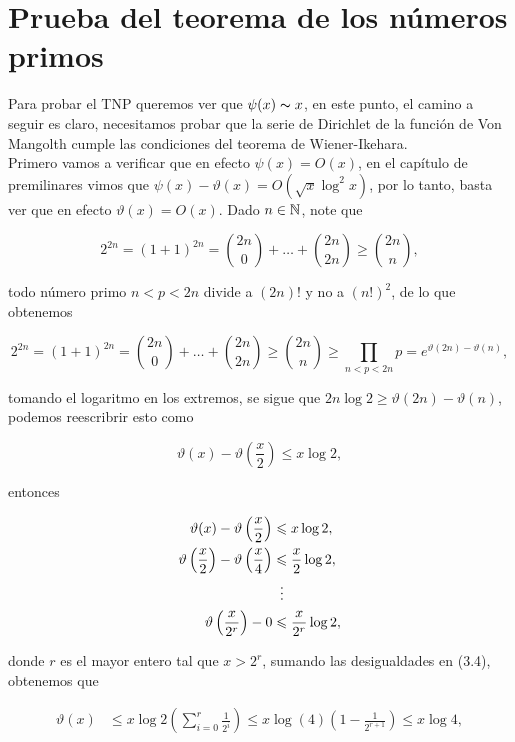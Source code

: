 \section{Prueba del teorema de los números primos}

Para probar el TNP queremos ver que $\psi(x)\thicksim x$, en este punto, el camino a seguir es claro, necesitamos probar que la serie de Dirichlet de la función de Von Mangolth cumple las condiciones del teorema de Wiener-Ikehara.\\

Primero vamos a verificar que en efecto $\psi(x)=O(x)$, en el capítulo de premilinares vimos que $\psi(x)-\vartheta(x)=O(\sqrt{x}\log^2 x)$, por lo tanto, basta ver que en efecto $\vartheta(x)=O(x)$. Dado $n\in \N$, note que

$$2^{2n}=(1+1)^{2n}=\binom{2n}{0}+\ldots+\binom{2n}{2n}\geq \binom{2n}{n},$$

todo número primo $n<p<2n$ divide a $(2n)!$ y no a $(n!)^2$, de lo que obtenemos

$$2^{2n}=(1+1)^{2n}=\binom{2n}{0}+\ldots+\binom{2n}{2n}\geq \binom{2n}{n}\geq \prod_{n<p<2n}p=e^{\displaystyle\vartheta(2n)-\vartheta(n)},$$

tomando el logaritmo en los extremos, se sigue que $2n\log 2\geq \vartheta(2n)-\vartheta(n)$, podemos reescribrir esto como

$$\vartheta(x)-\vartheta\left(\frac{x}{2}\right)\leq x\log 2,
$$

entonces

\begin{equation}
    \begin{aligned}
 \vartheta(x)-\vartheta\left(\frac{x}{2}\right) &\leq x\log2, \\
 \vartheta\left(\frac{x}{2}\right) -\vartheta\left(\frac{x}{4}\right) &\leq \frac{x}{2}\log2,\\
 &\hspace*{0.191cm}\vdots \\
 \vartheta\left(\frac{x}{2^r}\right)-0 &\leq \frac{x}{2^r}\log 2,
\end{aligned}
\end{equation}

donde $r$ es el mayor entero tal que $x>2^r$, sumando las desigualdades en (3.4), obtenemos que

\begin{align*}
    \vartheta(x)&\leq x\log 2\left(\sum_{i=0}^{r} \frac{1}{2^{i}}\right)\leq x\log(4)\left(1-\frac{1}{2^{r+1}}\right)\leq x\log 4
,\end{align*}

